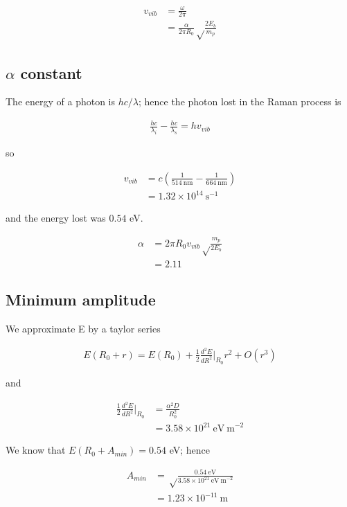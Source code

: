 \documentclass{article}
\begin{document}
\begin{align*}
v_{vib} &= \frac{\omega}{2\pi} \\
&= \frac{\alpha}{2\pi R_0}\sqrt\frac{2E_b}{m_p}
\end{align*}

\subsection{$\alpha$ constant}

The energy of a photon is $hc/\lambda$; hence the photon lost in the Raman process is

\begin{align*}
\frac{hc}{\lambda_i} - \frac{hc}{\lambda_s} = h v_{vib}
\end{align*}

so

\begin{align*}
v_{vib} &= c\left(\frac{1}{514\mathrm{\ nm}} - \frac{1}{664\mathrm{\ nm}}\right) \\
&= 1.32 \times 10^{14}\mathrm{\ s^{-1}}
\end{align*}

and the energy lost was $0.54$ eV.

\begin{align*}
\alpha &= 2\pi R_0 v_{vib} \sqrt\frac{m_p}{2E_b} \\
&= 2.11
\end{align*}

\subsection{Minimum amplitude}

We approximate E by a taylor series

\begin{align*}
E(R_0 + r) = E(R_0) + \frac{1}{2} \frac{d^2E}{dR^2}\Big|_{R_0} r^2 + O(r^3)
\end{align*}

and

\begin{align*}
\frac{1}{2} \frac{d^2E}{dR^2}\Big|_{R_0} &= \frac{\alpha^2D}{R_0^2} \\
&= 3.58 \times 10^{21}\mathrm{\ eV\ m}^{-2}
\end{align*}

We know that $E(R_0 + A_{min}) = 0.54$ eV; hence

\begin{align*}
A_{min} &= \sqrt\frac{0.54\mathrm{\ eV}}{3.58 \times 10^{21}\mathrm{\ eV\ m}^{-2}}\\
&= 1.23 \times 10^{-11} \mathrm{\ m}
\end{align*}
\end{document}
